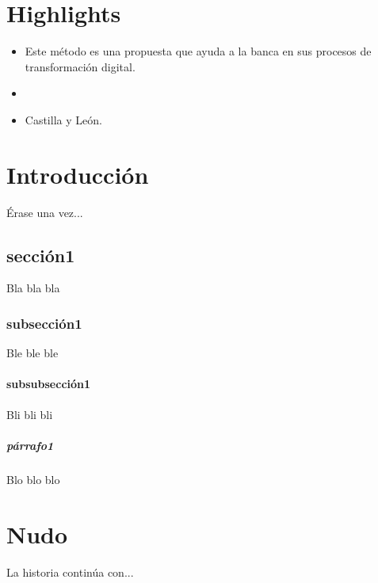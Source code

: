 \documentclass[a4paper,openright,12pt]{book}
\begin{document}
\chapter*{Highlights} %

\begin{itemize}
    \item Este método es una propuesta que ayuda a la banca en sus procesos de transformación digital.
    \item 
    \item Castilla y León.
    
\end{itemize}


\tableofcontents %

\cleardoublepage
{} %
\listoffigures %

\cleardoublepage
{} %
\listoftables %

\chapter{Introducción}\label{cap.introduccion}
Érase una vez...
\section{sección1}
Bla bla bla
\subsection{subsección1}
Ble ble ble
\subsubsection{subsubsección1}
Bli bli bli
\paragraph{párrafo1}
Blo blo blo

\chapter{Nudo}\label{cap.nudo}
La historia continúa con...
\end{document}

